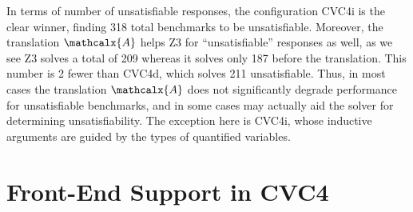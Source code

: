 \documentclass[runningheads,a4paper]{llncs}
\newcommand\cvcd{CVC4d\xspace}
\newcommand\cvci{CVC4i\xspace}
\newcommand\ziii{Z3\xspace}
\newcommand{\conv}{\mathcalx{A}}
\begin{document}
In terms of number of unsatisfiable responses, the configuration \cvci is the
clear winner, finding 318 total benchmarks to be unsatisfiable. Moreover, the
translation $\conv$ helps \ziii for ``unsatisfiable'' responses as well, as we
see \ziii solves a total of 209 whereas it solves only 187 before the
translation.
%
This number is 2 fewer than \cvcd, which solves 211 unsatisfiable. Thus, in
most cases the translation $\conv$ does not significantly degrade performance
for unsatisfiable benchmarks, and in some cases may actually aid the solver for
determining unsatisfiability. The exception here is \cvci, whose inductive
arguments are guided by the types of quantified variables.

\section{Front-End Support %
  in CVC4}
\label{sec:front-end}
\end{document}
